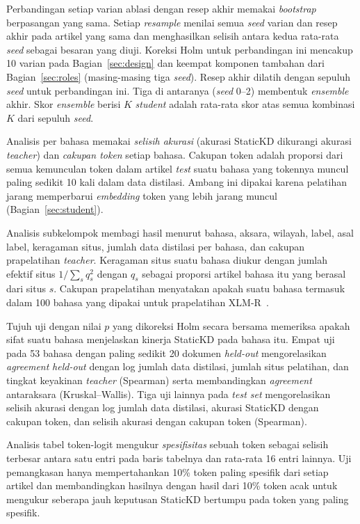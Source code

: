 \documentclass{ieeeaccess}
\newcommand{\en}[1]{\textit{#1}}
\begin{document}
Perbandingan setiap varian ablasi dengan resep akhir memakai \en{bootstrap} berpasangan yang sama. Setiap \en{resample} menilai semua \en{seed} varian dan resep akhir pada artikel yang sama dan menghasilkan selisih antara kedua rata-rata \en{seed} sebagai besaran yang diuji. Koreksi Holm untuk perbandingan ini mencakup 10 varian pada Bagian~\ref{sec:design} dan keempat komponen tambahan dari Bagian~\ref{sec:roles} (masing-masing tiga \en{seed}). Resep akhir dilatih dengan sepuluh \en{seed} untuk perbandingan ini. Tiga di antaranya (\en{seed} 0--2) membentuk \en{ensemble} akhir. Skor \en{ensemble} berisi $K$ \en{student} adalah rata-rata skor atas semua kombinasi $K$ dari sepuluh \en{seed}.

Analisis per bahasa memakai \emph{selisih akurasi} (akurasi StaticKD dikurangi akurasi \en{teacher}) dan \emph{cakupan token} setiap bahasa. Cakupan token adalah proporsi dari semua kemunculan token dalam artikel \en{test} suatu bahasa yang tokennya muncul paling sedikit 10 kali dalam data distilasi. Ambang ini dipakai karena pelatihan jarang memperbarui \en{embedding} token yang lebih jarang muncul (Bagian~\ref{sec:student}).

Analisis subkelompok membagi hasil menurut bahasa, aksara, wilayah, label, asal label, keragaman situs, jumlah data distilasi per bahasa, dan cakupan prapelatihan \en{teacher}. Keragaman situs suatu bahasa diukur dengan jumlah efektif situs $1/\sum_s q_s^{2}$ dengan $q_s$ sebagai proporsi artikel bahasa itu yang berasal dari situs $s$. Cakupan prapelatihan menyatakan apakah suatu bahasa termasuk dalam 100 bahasa yang dipakai untuk prapelatihan XLM-R~\cite{conneau2020xlmr}.

Tujuh uji dengan nilai $p$ yang dikoreksi Holm secara bersama memeriksa apakah sifat suatu bahasa menjelaskan kinerja StaticKD pada bahasa itu. Empat uji pada 53 bahasa dengan paling sedikit 20 dokumen \en{held-out} mengorelasikan \en{agreement} \en{held-out} dengan log jumlah data distilasi, jumlah situs pelatihan, dan tingkat keyakinan \en{teacher} (Spearman) serta membandingkan \en{agreement} antaraksara (Kruskal--Wallis). Tiga uji lainnya pada \en{test set} mengorelasikan selisih akurasi dengan log jumlah data distilasi, akurasi StaticKD dengan cakupan token, dan selisih akurasi dengan cakupan token (Spearman).

Analisis tabel token-logit mengukur \emph{spesifisitas} sebuah token sebagai selisih terbesar antara satu entri pada baris tabelnya dan rata-rata 16 entri lainnya. Uji pemangkasan hanya mempertahankan 10\% token paling spesifik dari setiap artikel dan membandingkan hasilnya dengan hasil dari 10\% token acak untuk mengukur seberapa jauh keputusan StaticKD bertumpu pada token yang paling spesifik.
\end{document}

